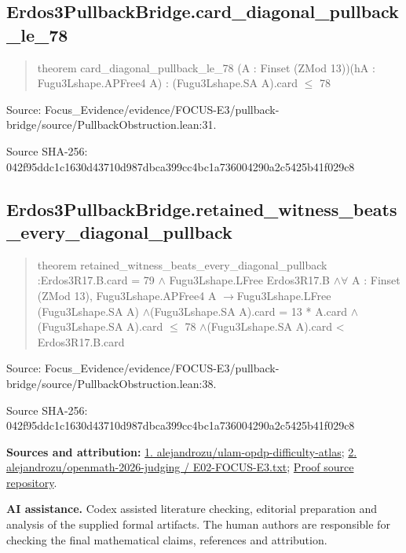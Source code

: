\documentclass[11pt,a4paper]{article}
\begin{document}
\begin{samepage}
\subsection{Erdos3PullbackBridge.card\_diagonal\_pullback\_le\_78}
\begin{quote}\small\ttfamily theorem card\_diagonal\_pullback\_le\_78 (A : Finset (ZMod 13))\newline     (hA : Fugu3Lshape.APFree4 A) : (Fugu3Lshape.SA A).card \ensuremath{\leq} 78\end{quote}
{\small Source: Focus\_Evidence/evidence/FOCUS-E3/pullback-bridge/source/PullbackObstruction.lean:31.\par}

{\small Source SHA-256: 042f95ddc1c1630d43710d987dbca399cc4bc1a736004290a2c5425b41f029c8\par}

\end{samepage}
\begin{samepage}
\subsection{Erdos3PullbackBridge.retained\_witness\_beats\_every\_diagonal\_pullback}
\begin{quote}\small\ttfamily theorem retained\_witness\_beats\_every\_diagonal\_pullback :\newline     Erdos3R17.B.card = 79 \ensuremath{\wedge} Fugu3Lshape.LFree Erdos3R17.B \ensuremath{\wedge}\newline     \ensuremath{\forall} A : Finset (ZMod 13), Fugu3Lshape.APFree4 A \ensuremath{\to}\newline       Fugu3Lshape.LFree (Fugu3Lshape.SA A) \ensuremath{\wedge}\newline       (Fugu3Lshape.SA A).card = 13 * A.card \ensuremath{\wedge}\newline       (Fugu3Lshape.SA A).card \ensuremath{\leq} 78 \ensuremath{\wedge}\newline       (Fugu3Lshape.SA A).card < Erdos3R17.B.card\end{quote}
{\small Source: Focus\_Evidence/evidence/FOCUS-E3/pullback-bridge/source/PullbackObstruction.lean:38.\par}

{\small Source SHA-256: 042f95ddc1c1630d43710d987dbca399cc4bc1a736004290a2c5425b41f029c8\par}

{\small\textbf{Sources and attribution:} \href{https://github.com/alejandrozu/ulam-opdp-difficulty-atlas}{1. alejandrozu/ulam-opdp-difficulty-atlas}; \href{https://github.com/alejandrozu/openmath-2026-judging/blob/d0ed487f487fa7ec814ff705ab55249983fe8707/OpenMath-Judging/review/entries/E02-FOCUS-E3.txt}{2. alejandrozu/openmath-2026-judging / E02-FOCUS-E3.txt}; \href{https://github.com/alejandrozu/openmath-2026-judging}{Proof source repository}.\par}

\end{samepage}
{\small \textbf{AI assistance.} Codex assisted literature checking, editorial preparation and analysis of the supplied formal artifacts. The human authors are responsible for checking the final mathematical claims, references and attribution.\par}
\end{document}
